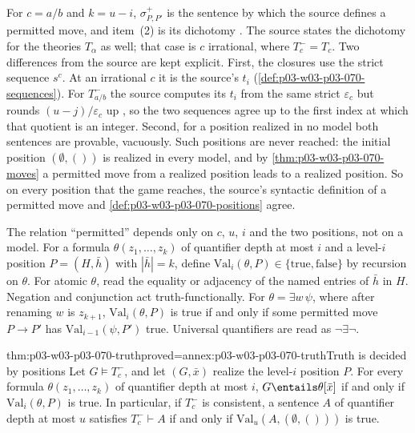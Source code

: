 For \(c=a/b\) and \(k=u-i\), \(\sigma^+_{P,P'}\) is the sentence by which the
source defines a permitted move, and item~(2) is its dichotomy
\cite[pp.~20--21]{Spencer2007LogicRandomStructuresAuthor}.  The source states
the dichotomy for the theories \(T_\alpha\) as well; that case is \(c\)
irrational, where \(T^-_c=T_c\).  Two differences from the source are kept
explicit.  First, the closures use the strict sequence \(s^c\).  At an
irrational \(c\) it is the source's \(t_i\)
(\cref{def:p03-w03-p03-070-sequences}).  For \(T^-_{a/b}\) the source
computes its \(t_i\) from the same strict \(\varepsilon_c\) but rounds
\((u-j)/\varepsilon_c\) up \cite[p.~20]{Spencer2007LogicRandomStructuresAuthor},
so the two sequences agree up to the first index at which that quotient is an
integer.  Second, for a position realized in no model both sentences are
provable, vacuously.  Such positions are never reached: the initial position
\((\emptyset,())\) is realized in every model, and by
\cref{thm:p03-w03-p03-070-moves} a permitted move from a realized position
leads to a realized position.  So on every position that the game reaches,
the source's syntactic definition of a permitted move and
\cref{def:p03-w03-p03-070-positions} agree.

The relation ``permitted'' depends only on \(c\), \(u\), \(i\) and the two
positions, not on a model.  For a formula \(\theta(z_1,\ldots,z_k)\) of
quantifier depth at most \(i\) and a level-\(i\) position \(P=(H,\bar h)\) with
\(|\bar h|=k\), define \(\mathrm{Val}_i(\theta,P)\in\{\text{true},\text{false}\}\)
by recursion on \(\theta\).  For atomic \(\theta\), read the equality or
adjacency of the named entries of \(\bar h\) in \(H\).  Negation and
conjunction act truth-functionally.  For \(\theta=\exists w\,\psi\), where
after renaming \(w\) is \(z_{k+1}\),
\(\mathrm{Val}_i(\theta,P)\) is true if and only if some permitted move
\(P\to P'\) has \(\mathrm{Val}_{i-1}(\psi,P')\) true.  Universal quantifiers
are read as \(\neg\exists\neg\).

\begin{hblemma}{thm:p03-w03-p03-070-truth}{proved=annex:p03-w03-p03-070-truth}{Truth is decided by positions}
Let \(G\models T^-_c\), and let \((G,\bar x)\) realize the level-\(i\) position
\(P\).  For every formula \(\theta(z_1,\ldots,z_k)\) of quantifier depth at
most \(i\), \(G\entails\theta[\bar x]\) if and only if
\(\mathrm{Val}_i(\theta,P)\) is true.  In particular, if \(T^-_c\) is
consistent, a sentence \(A\) of quantifier depth at most \(u\) satisfies
\(T^-_c\vdash A\) if and only if \(\mathrm{Val}_u(A,(\emptyset,()))\) is true.
\end{hblemma}

